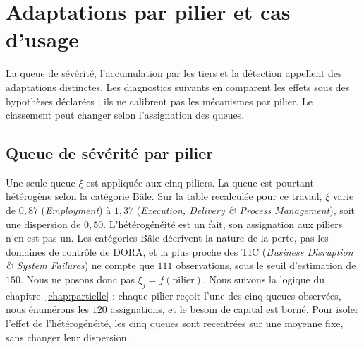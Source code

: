 
\chapter{Adaptations par pilier et cas d'usage}
\label{chap:adaptations}

La queue de sévérité, l'accumulation par les tiers et la détection appellent des adaptations
distinctes. Les diagnostics suivants en comparent les effets sous des hypothèses déclarées ; ils
ne calibrent pas les mécanismes par pilier. Le classement peut changer selon l'assignation des queues.

\section{Queue de sévérité par pilier}
\label{sec:xi-pilier}

Une seule queue $\xi$ est appliquée aux cinq piliers. La queue est pourtant hétérogène selon la
catégorie Bâle. Sur la table recalculée pour ce travail, $\xi$ varie de $0{,}87$
(\emph{Employment}) à $1{,}37$ (\emph{Execution, Delivery \& Process Management}), soit une
dispersion de $0{,}50$.
L'hétérogénéité est un fait, son assignation aux piliers n'en est pas un. Les catégories Bâle
décrivent la nature de la perte, pas les domaines de contrôle de DORA, et la plus proche des TIC
(\emph{Business Disruption \& System Failures}) ne compte que $111$ observations, sous le seuil
d'estimation de $150$. Nous ne posons donc pas $\xi_j = f(\text{pilier})$. Nous suivons la logique du
chapitre~\ref{chap:partielle} : chaque pilier reçoit l'une des cinq queues observées, nous énumérons
les $120$ assignations, et le besoin de capital est borné. Pour isoler l'effet de
l'hétérogénéité, les cinq queues sont recentrées sur une moyenne fixe, sans changer leur dispersion.

